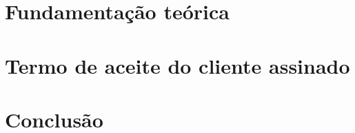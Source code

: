 \documentclass[12pt,oneside,a4paper,article]{abntex2}
\begin{document}
    \newpage                                     
    \section{Fundamentação teórica}              
           
    \vspace{12mm}                                
    
    \newpage                                        
    \section{Termo de aceite do cliente assinado}   
                     
    \vspace{12mm}                                   
    
    \newpage                                
    \section{Conclusão}                     
          
        
    
    
\end{document}
